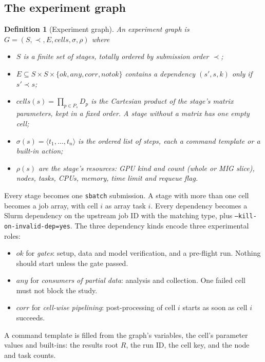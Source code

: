 \documentclass[pdflatex,sn-mathphys-num]{sn-jnl}
\theoremstyle{thmstyleone}%
\theoremstyle{thmstyletwo}%
\theoremstyle{thmstylethree}%
\newtheorem{definition}{Definition}%
\newcommand{\code}[1]{\texttt{#1}}
\begin{document}
\subsection{The experiment graph}\label{sec:graph}

\begin{definition}[Experiment graph]\label{def:graph}
An experiment graph is $G=(S,\prec,E,\mathit{cells},\sigma,\rho)$ where
\begin{itemize}[leftmargin=1.4em, itemsep=1pt]
\item $S$ is a finite set of \emph{stages}, totally ordered by submission
order $\prec$;
\item $E\subseteq S\times S\times\{\mathit{ok},\mathit{any},\mathit{corr},\mathit{notok}\}$
contains a \emph{dependency} $(s',s,k)$ only if $s'\prec s$;
\item $\mathit{cells}(s)=\prod_{p\in P_s} D_p$ is the Cartesian product of the
stage's \emph{matrix} parameters, kept in a fixed order. A stage without a
matrix has one empty cell;
\item $\sigma(s)=\langle t_1,\dots,t_n\rangle$ is the ordered list of
\emph{steps}, each a command template or a built-in action;
\item $\rho(s)$ are the stage's \emph{resources}: GPU kind and count (whole or
MIG slice), nodes, tasks, CPUs, memory, time limit and requeue flag.
\end{itemize}
\end{definition}

Every stage becomes one \code{sbatch} submission. A stage with more than one
cell becomes a job array, with cell $i$ as array task $i$. Every dependency
becomes a Slurm dependency on the upstream job ID with the matching type, plus
\code{--kill-on-invalid-dep=yes}. The three dependency kinds encode three
experimental roles:
\begin{itemize}[leftmargin=1.4em, itemsep=1pt]
\item $\mathit{ok}$ for \emph{gates}: setup, data and model verification, and a
pre-flight run. Nothing should start unless the gate passed.
\item $\mathit{any}$ for \emph{consumers of partial data}: analysis and
collection. One failed cell must not block the study.
\item $\mathit{corr}$ for \emph{cell-wise pipelining}: post-processing of cell
$i$ starts as soon as cell $i$ succeeds.
\end{itemize}
A command template is filled from the graph's variables, the cell's parameter
values and built-ins: the results root $R$, the run ID, the cell key, and the
node and task counts.
\end{document}
